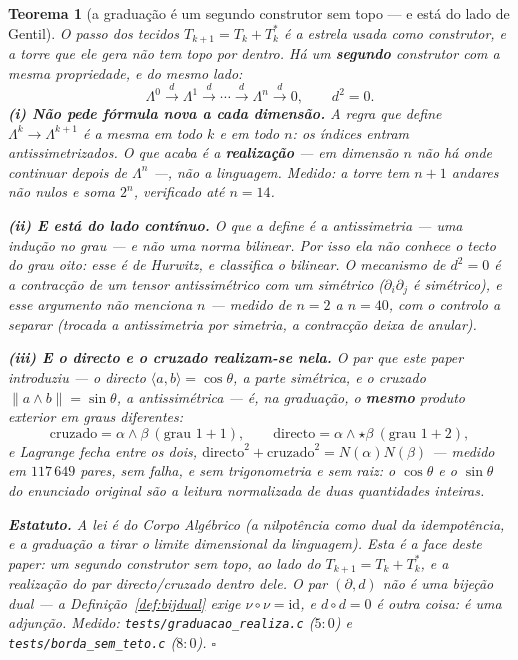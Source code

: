 \documentclass[11pt,a4paper]{article}
\newcommand{\code}[1]{\texttt{\small #1}}
\newtheorem{teorema}{Teorema}
\begin{document}
\begin{teorema}[a graduação é um segundo construtor sem topo --- e está
do lado de Gentil]\label{thm:graduacao-gentil}
O passo dos tecidos $T_{k+1}=T_k+T_k^{*}$ é a estrela usada como
construtor, e a torre que ele gera não tem topo por dentro. Há um
\textbf{segundo} construtor com a mesma propriedade, e do mesmo lado:
\[
\boxed{\;
\Lambda^{0}\xrightarrow{\;d\;}\Lambda^{1}\xrightarrow{\;d\;}\cdots
\xrightarrow{\;d\;}\Lambda^{n}\xrightarrow{\;d\;}0,
\qquad d^{2}=0.
\;}
\]
\textbf{(i) Não pede fórmula nova a cada dimensão.} A regra que define
$\Lambda^{k}\to\Lambda^{k+1}$ é a mesma em todo $k$ e em todo $n$: os
índices entram antissimetrizados. O que \emph{acaba} é a
\textbf{realização} --- em dimensão $n$ não há onde continuar depois de
$\Lambda^{n}$ ---, não a linguagem. Medido: a torre tem $n{+}1$ andares
não nulos e soma $2^{n}$, verificado até $n=14$.

\textbf{(ii) E está do lado contínuo.} O que a define é a
\emph{antissimetria} --- uma indução no grau --- e não uma norma
bilinear. Por isso ela não conhece o tecto do grau oito: esse é de
Hurwitz, e classifica o \emph{bilinear}. O mecanismo de $d^{2}=0$ é a
contracção de um tensor antissimétrico com um simétrico
($\partial_i\partial_j$ é simétrico), e esse argumento \emph{não
menciona $n$} --- medido de $n=2$ a $n=40$, com o controlo a separar
(trocada a antissimetria por simetria, a contracção deixa de anular).

\textbf{(iii) E o directo e o cruzado realizam-se nela.} O par que
este paper introduziu --- o \emph{directo} $\langle a,b\rangle=\cos\theta$,
a parte simétrica, e o \emph{cruzado} $\|a\wedge b\|=\sin\theta$, a
antissimétrica --- é, na graduação, o \textbf{mesmo} produto exterior
em graus diferentes:
\[
\text{cruzado}=\alpha\wedge\beta\ (\text{grau }1{+}1),
\qquad
\text{directo}=\alpha\wedge\star\beta\ (\text{grau }1{+}2),
\]
e Lagrange fecha entre os dois,
$\text{directo}^{2}+\text{cruzado}^{2}=N(\alpha)N(\beta)$ --- medido em
$117\,649$ pares, sem falha, e \emph{sem trigonometria e sem raiz}: o
$\cos\theta$ e o $\sin\theta$ do enunciado original são a leitura
normalizada de duas quantidades inteiras.

\textbf{Estatuto.} A lei é do \emph{Corpo Algébrico} (a nilpotência
como dual da idempotência, e a graduação a tirar o limite dimensional
da linguagem). Esta é a face deste paper: um segundo construtor sem
topo, ao lado do $T_{k+1}=T_k+T_k^{*}$, e a realização do par
directo/cruzado dentro dele. O par $(\partial,d)$ \emph{não} é uma
bijeção dual --- a Definição~\ref{def:bijdual} exige
$\nu\circ\nu=\mathrm{id}$, e $d\circ d=0$ é outra coisa: é uma
adjunção.
\emph{Medido:} \code{tests/graduacao\_realiza.c} ($5{:}0$) e
\code{tests/borda\_sem\_teto.c} ($8{:}0$).
$\square$
\end{teorema}
\end{document}
